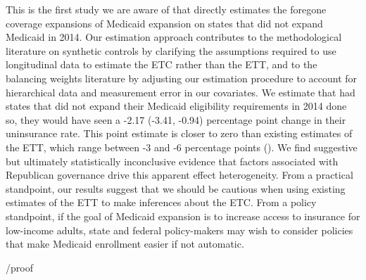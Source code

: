 \documentclass[aoas]{imsart}
\theoremstyle{plain}
\theoremstyle{remark}
\begin{document}
This is the first study we are aware of that directly estimates the foregone coverage expansions of Medicaid expansion on states that did not expand Medicaid in 2014. Our estimation approach contributes to the methodological literature on synthetic controls by clarifying the assumptions required to use longitudinal data to estimate the ETC rather than the ETT, and to the balancing weights literature by adjusting our estimation procedure to account for hierarchical data and measurement error in our covariates. We estimate that had states that did not expand their Medicaid eligibility requirements in 2014 done so, they would have seen a -2.17 (-3.41, -0.94) percentage point change in their uninsurance rate. This point estimate is closer to zero than existing estimates of the ETT, which range between -3 and -6 percentage points (\cite{frean2017premium}). We find suggestive but ultimately statistically inconclusive evidence that factors associated with Republican governance drive this apparent effect heterogeneity. From a practical standpoint, our results suggest that we should be cautious when using existing estimates of the ETT to make inferences about the ETC. From a policy standpoint, if the goal of Medicaid expansion is to increase access to insurance for low-income adults, state and federal policy-makers may wish to consider policies that make Medicaid enrollment easier if not automatic.

\begin{appendix}

{/proof}









\end{appendix}
\end{document}
